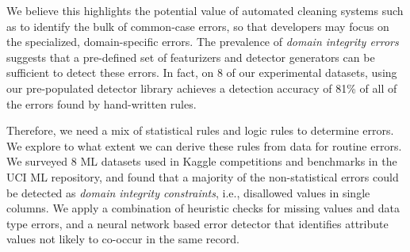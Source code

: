 We believe this highlights the potential value of automated cleaning systems such as \sys to identify the bulk of common-case errors, so that developers may focus on the specialized, domain-specific errors.  The prevalence of {\it domain integrity errors} suggests that a pre-defined set of featurizers and detector generators can be sufficient to detect these errors.  In fact, on 8 of our experimental datasets, \sys using our pre-populated detector library achieves a detection accuracy of 81\% of all of the errors found by hand-written rules.

Therefore, we need a mix of statistical rules and logic rules to determine errors.
We explore to what extent we can derive these rules from data for routine errors. 
We surveyed 8 ML datasets used in Kaggle competitions and benchmarks in the UCI ML repository, and found that a majority of the non-statistical errors could be detected as \emph{domain integrity constraints}, i.e., disallowed values in single columns.
We apply a combination of heuristic checks for missing values and data type errors, and a neural network based error detector that identifies attribute values not likely to co-occur in the same record.

